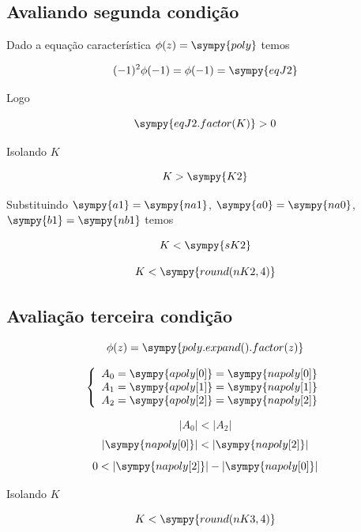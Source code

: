 \documentclass[a4paper,11pt]{article}
\newcommand{\npy}[1]{\sympy{round(#1,4)}}
\begin{document}
\subsection{Avaliando segunda condição}

Dado a equação característica $\phi(z) = \sympy{poly}$ temos

$$(-1)^2\phi(-1) = \phi(-1) = \sympy{eqJ2}$$

Logo

$$\sympy{eqJ2.factor(K)} > 0$$

Isolando $K$

\begin{equation}\label{eq:k-jury-c2}
    K > \sympy{K2}
\end{equation}

Substituindo $\sympy{a1} = \sympy{na1}$, $\sympy{a0} = \sympy{na0}$, $\sympy{b1} = \sympy{nb1}$ temos

$$K < \sympy{sK2}$$

\begin{equation}\label{eq:k-jury-c2-numeric}
    K < \npy{nK2}
\end{equation}

\subsection{Avaliação terceira condição}

$$\phi(z) = \sympy{poly.expand().factor(z)}$$

$$
\left\{\begin{array}{l}
A_0 = \sympy{apoly[0]} = \sympy{napoly[0]}\\
A_1 = \sympy{apoly[1]} = \sympy{napoly[1]}\\
A_2 = \sympy{apoly[2]} = \sympy{napoly[2]}\\
\end{array}
\right.
$$

$$|A_0| < |A_2|$$
$$|\sympy{napoly[0]}| < |\sympy{napoly[2]}|$$
$$0 < |\sympy{napoly[2]}| - |\sympy{napoly[0]}|$$

Isolando $K$

\begin{equation}\label{eq:k-jury-c3-numeric}
    K < \npy{nK3}
\end{equation}



\end{document}
